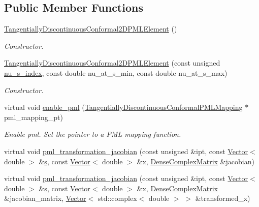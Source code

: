 \subsection*{Public Member Functions}
\begin{DoxyCompactItemize}
\item 
\hyperlink{classoomph_1_1TangentiallyDiscontinuousConformal2DPMLElement_a172381a66f0efa02d3827d8c1a50ac80}{Tangentially\+Discontinuous\+Conformal2\+D\+P\+M\+L\+Element} ()
\begin{DoxyCompactList}\small\item\em Constructor. \end{DoxyCompactList}\item 
\hyperlink{classoomph_1_1TangentiallyDiscontinuousConformal2DPMLElement_a207d8cad6fb66361a2235b2386aab814}{Tangentially\+Discontinuous\+Conformal2\+D\+P\+M\+L\+Element} (const unsigned \hyperlink{classoomph_1_1Conformal2DPMLElement_ac0fae35f94a70e615a8bbd47716a32d3}{nu\+\_\+s\+\_\+index}, const double nu\+\_\+at\+\_\+s\+\_\+min, const double nu\+\_\+at\+\_\+s\+\_\+max)
\begin{DoxyCompactList}\small\item\em Constructor. \end{DoxyCompactList}\item 
virtual void \hyperlink{classoomph_1_1TangentiallyDiscontinuousConformal2DPMLElement_a656d6b337a04f9b889637f0cbbcf209b}{enable\+\_\+pml} (\hyperlink{classoomph_1_1TangentiallyDiscontinuousConformalPMLMapping}{Tangentially\+Discontinuous\+Conformal\+P\+M\+L\+Mapping} $\ast$pml\+\_\+mapping\+\_\+pt)
\begin{DoxyCompactList}\small\item\em Enable pml. Set the pointer to a P\+ML mapping function. \end{DoxyCompactList}\item 
virtual void \hyperlink{classoomph_1_1TangentiallyDiscontinuousConformal2DPMLElement_a906b78ba975b45dd3702ee8b42dc68cd}{pml\+\_\+transformation\+\_\+jacobian} (const unsigned \&ipt, const \hyperlink{classoomph_1_1Vector}{Vector}$<$ double $>$ \&\hyperlink{cfortran_8h_ab7123126e4885ef647dd9c6e3807a21c}{s}, const \hyperlink{classoomph_1_1Vector}{Vector}$<$ double $>$ \&x, \hyperlink{classoomph_1_1DenseComplexMatrix}{Dense\+Complex\+Matrix} \&jacobian)
\item 
virtual void \hyperlink{classoomph_1_1TangentiallyDiscontinuousConformal2DPMLElement_a2436ebd949ec246a11a7b617a890443e}{pml\+\_\+transformation\+\_\+jacobian} (const unsigned \&ipt, const \hyperlink{classoomph_1_1Vector}{Vector}$<$ double $>$ \&\hyperlink{cfortran_8h_ab7123126e4885ef647dd9c6e3807a21c}{s}, const \hyperlink{classoomph_1_1Vector}{Vector}$<$ double $>$ \&x, \hyperlink{classoomph_1_1DenseComplexMatrix}{Dense\+Complex\+Matrix} \&jacobian\+\_\+matrix, \hyperlink{classoomph_1_1Vector}{Vector}$<$ std\+::complex$<$ double $>$ $>$ \&transformed\+\_\+x)

\end{DoxyCompactItemize}
